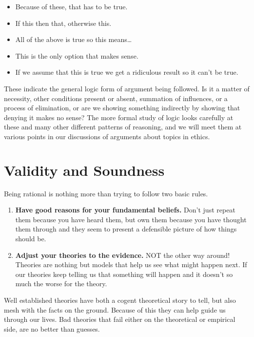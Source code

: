 \documentclass[
  12pt, openany]{book}
\makeatletter
\providecommand{\tightlist}{%
  \setlength{\itemsep}{0pt}\setlength{\parskip}{0pt}}
\newenvironment{kframe}{%
\medskip{}
\setlength{\fboxsep}{.8em}
 \def\at@end@of@kframe{}%
 \ifinner\ifhmode%
  \def\at@end@of@kframe{\end{minipage}}%
  \begin{minipage}{\columnwidth}%
 \fi\fi%
 \def\FrameCommand##1{\hskip\@totalleftmargin \hskip-\fboxsep
 \colorbox{shadecolor}{##1}\hskip-\fboxsep
     \hskip-\linewidth \hskip-\@totalleftmargin \hskip\columnwidth}%
 \MakeFramed {\advance\hsize-\width
   \@totalleftmargin\z@ \linewidth\hsize
   \@setminipage}}%
 {\par\unskip\endMakeFramed%
 \at@end@of@kframe}
\newenvironment{rmdblock}[1]
  {
  \begin{itemize}
  \renewcommand{\labelitemi}{
    \raisebox{-.7\height}[0pt][0pt]{
      {\setkeys{Gin}{width=3em,keepaspectratio}\texttt{[image: img/\#1]}}
    }
  }
  \setlength{\fboxsep}{1em}
  \begin{kframe}
  \item
  }
  {
  \end{kframe}
  \end{itemize}
  }
\newenvironment{note}
  {\begin{rmdblock}{note}}
  {\end{rmdblock}}
\makeatother
\begin{document}
\begin{note}

\begin{itemize}
\tightlist
\item
  Because of these, that has to be true.
\item
  If this then that, otherwise this.
\item
  All of the above is true so this means\ldots{}
\item
  This is the only option that makes sense.
\item
  If we assume that this is true we get a ridiculous result so it can't be true.
\end{itemize}

\end{note}

These indicate the general logic form of argument being followed. Is it a matter of necessity, other conditions present or absent, summation of influences, or a process of elimination, or are we showing something indirectly by showing that denying it makes no sense? The more formal study of logic looks carefully at these and many other different patterns of reasoning, and we will meet them at various points in our discussions of arguments about topics in ethics.

\hypertarget{validity-and-soundness}{%
\section{Validity and Soundness}\label{validity-and-soundness}}

\begin{note}

Being rational is nothing more than trying to follow two basic rules.

\begin{enumerate}
\def\labelenumi{\arabic{enumi}.}
\tightlist
\item
  \textbf{Have good reasons for your fundamental beliefs.} Don't just repeat them because you have heard them, but own them because you have thought them through and they seem to present a defensible picture of how things should be.
\item
  \textbf{Adjust your theories to the evidence.} NOT the other way around! Theories are nothing but models that help us see what might happen next. If our theories keep telling us that something will happen and it doesn't so much the worse for the theory.
\end{enumerate}

Well established theories have both a cogent theoretical story to tell, but also mesh with the facts on the ground. Because of this they can help guide us through our lives. Bad theories that fail either on the theoretical or empirical side, are no better than guesses.

\end{note}
\end{document}
